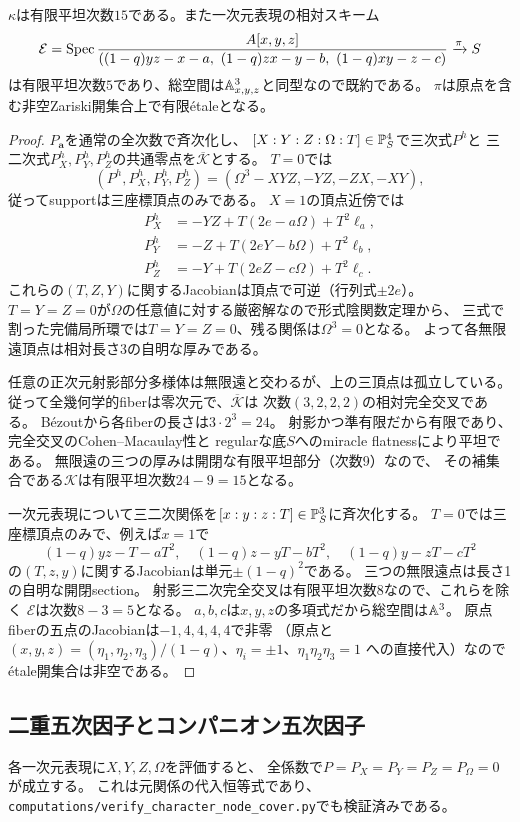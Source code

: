 \begin{theorem}[次数十五と五の全係数有限平坦性]
\label{thm:relative-critical-flat}
$\kappa$は有限平坦次数$15$である。また一次元表現の相対スキーム
\[
 \mathcal E=\Spec\frac{A[x,y,z]}
 {((1-q)yz-x-a,\ (1-q)zx-y-b,\ (1-q)xy-z-c)}
 \xrightarrow{\pi}S
\]
は有限平坦次数$5$であり、総空間は$\AA^3_{x,y,z}$と同型なので既約である。
$\pi$は原点を含む非空Zariski開集合上で有限\'{e}taleとなる。
\end{theorem}
\begin{proof}
$P_{\mathbf a}$を通常の全次数で斉次化し、
$[X:Y:Z:\Omega:T]\in\PP^4_S$で三次式$P^h$と
三二次式$P_X^h,P_Y^h,P_Z^h$の共通零点を$\overline{\mathcal K}$とする。
$T=0$では
\[
 (P^h,P_X^h,P_Y^h,P_Z^h)
 =(\Omega^3-XYZ,-YZ,-ZX,-XY),
\]
従ってsupportは三座標頂点のみである。
$X=1$の頂点近傍では
\begin{align*}
P_X^h&=-YZ+T(2e-a\Omega)+T^2\ell_a,\\
P_Y^h&=-Z+T(2eY-b\Omega)+T^2\ell_b,\\
P_Z^h&=-Y+T(2eZ-c\Omega)+T^2\ell_c .
\end{align*}
これらの$(T,Z,Y)$に関するJacobianは頂点で可逆（行列式$\pm2e$）。
$T=Y=Z=0$が$\Omega$の任意値に対する厳密解なので形式陰関数定理から、
三式で割った完備局所環では$T=Y=Z=0$、残る関係は$\Omega^3=0$となる。
よって各無限遠頂点は相対長さ3の自明な厚みである。

任意の正次元射影部分多様体は無限遠と交わるが、上の三頂点は孤立している。
従って全幾何学的fiberは零次元で、$\overline{\mathcal K}$は
次数$(3,2,2,2)$の相対完全交叉である。
B\'{e}zoutから各fiberの長さは$3\cdot2^3=24$。
射影かつ準有限だから有限であり、完全交叉のCohen--Macaulay性と
regularな底$S$へのmiracle flatnessにより平坦である。
無限遠の三つの厚みは開閉な有限平坦部分（次数9）なので、
その補集合である$\mathcal K$は有限平坦次数$24-9=15$となる。

一次元表現について三二次関係を$[x:y:z:T]\in\PP^3_S$に斉次化する。
$T=0$では三座標頂点のみで、例えば$x=1$で
\[
 (1-q)yz-T-aT^2,\quad (1-q)z-yT-bT^2,\quad
 (1-q)y-zT-cT^2
\]
の$(T,z,y)$に関するJacobianは単元$\pm(1-q)^2$である。
三つの無限遠点は長さ1の自明な開閉section。
射影三二次完全交叉は有限平坦次数$8$なので、これらを除く
$\mathcal E$は次数$8-3=5$となる。
$a,b,c$は$x,y,z$の多項式だから総空間は$\AA^3$。
原点fiberの五点のJacobianは$-1,4,4,4,4$で非零
（原点と $(x,y,z)=(\eta_1,\eta_2,\eta_3)/(1-q)$、$\eta_i=\pm1$、$\eta_1\eta_2\eta_3=1$ への直接代入）なので\'{e}tale開集合は非空である。
\end{proof}

\subsection{二重五次因子とコンパニオン五次因子}
各一次元表現に$X,Y,Z,\Omega$を評価すると、
全係数で$P=P_X=P_Y=P_Z=P_\Omega=0$が成立する。
これは元関係の代入恒等式であり、
\texttt{computations/verify\_character\_node\_cover.py}でも検証済みである。

